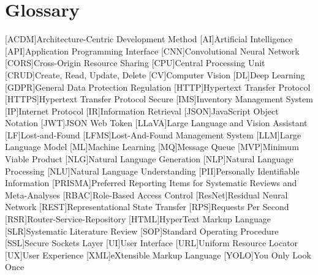 \chapter{Glossary}

\footnotesize
\DoubleSpacing

\begin{multicols}{2}
\begin{acronym}[]
	[ACDM]{Architecture-Centric Development Method}
	[AI]{Artificial Intelligence}
	[API]{Application Programming Interface}
	[CNN]{Convolutional Neural Network}
	[CORS]{Cross-Origin Resource Sharing}
	[CPU]{Central Processing Unit}
	[CRUD]{Create, Read, Update, Delete}
	[CV]{Computer Vision}
	[DL]{Deep Learning}
	[GDPR]{General Data Protection Regulation}
	[HTTP]{Hypertext Transfer Protocol}
	[HTTPS]{Hypertext Transfer Protocol Secure}
	[IMS]{Inventory Management System}
	[IP]{Internet Protocol}
	[IR]{Information Retrieval}
	[JSON]{JavaScript Object Notation}
	[JWT]{JSON Web Token}
	[LLaVA]{Large Language and Vision Assistant}
	[LF]{Lost-and-Found}
	[LFMS]{Lost-And-Found Management System}
	[LLM]{Large Language Model}
	[ML]{Machine Learning}
	[MQ]{Message Queue}
	[MVP]{Minimum Viable Product}
	[NLG]{Natural Language Generation}
	[NLP]{Natural Language Processing}
	[NLU]{Natural Language Understanding}
	[PII]{Personally Identifiable Information}
	[PRISMA]{Preferred Reporting Items for Systematic Reviews and Meta-Analyses}
	[RBAC]{Role-Based Access Control}
	[ResNet]{Residual Neural Network}
	[REST]{Representational State Transfer}
	[RPS]{Requests Per Second}
	[RSR]{Router-Service-Repository}
	[HTML]{HyperText Markup Language}
	[SLR]{Systematic Literature Review}
	[SOP]{Standard Operating Procedure}
	[SSL]{Secure Sockets Layer}
	[UI]{User Interface}
	[URL]{Uniform Resource Locator}
	[UX]{User Experience}
	[XML]{eXtensible Markup Language}
	[YOLO]{You Only Look Once}
\end{acronym}
\end{multicols}

